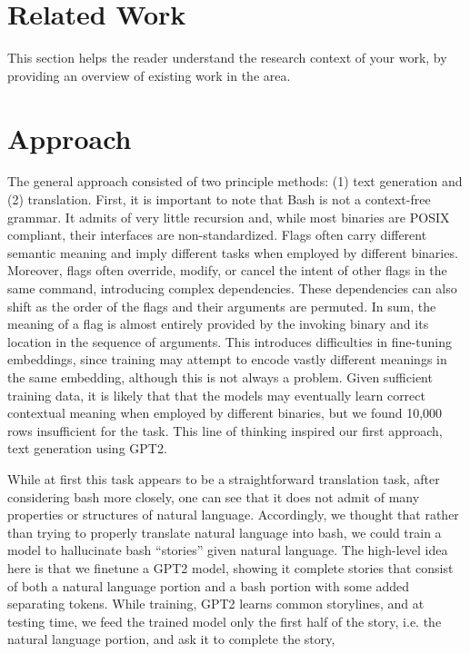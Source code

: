 \documentclass{article}
\begin{document}
\section{Related Work}
This section helps the reader understand the research context of your work, by providing an overview of existing work in the area.

\color{red}
\section{Approach}
\color{black}
The general approach consisted of two principle methods: (1) text generation
and (2) translation. First, it is important to note that Bash is not a
context-free grammar. It admits of very little recursion and, while most
binaries are POSIX compliant, their interfaces are non-standardized. Flags
often carry different semantic meaning and imply different tasks when employed
by different binaries. Moreover, flags often override, modify, or cancel the
intent of other flags in the same command, introducing complex dependencies.
These dependencies can also shift as the order of the flags and their arguments
are permuted. In sum, the meaning of a flag is almost entirely provided by the
invoking binary and its location in the sequence of arguments. This introduces
difficulties in fine-tuning embeddings, since training may attempt to encode
vastly different meanings in the same embedding, although this is not always a
problem. Given sufficient training data, it is likely that that the models may
eventually learn correct contextual meaning when employed by different
binaries, but we found 10,000 rows insufficient for the task. This line of
thinking inspired our first approach, text generation using GPT2.
\par
While at first this task appears to be a straightforward translation task,
after considering bash more closely, one can see that it does not admit of many
properties or structures of natural language. Accordingly, we thought that
rather than trying to properly translate natural language into bash, we could
train a model to hallucinate bash ``stories'' given natural language. The
high-level idea here is that we finetune a GPT2 model, showing it complete
stories that consist of both a natural language portion and a bash portion with
some added separating tokens. While training, GPT2 learns common storylines,
and at testing time, we feed the trained model only the first half of the
story, i.e. the natural language portion, and ask it to complete the story,
\end{document}
